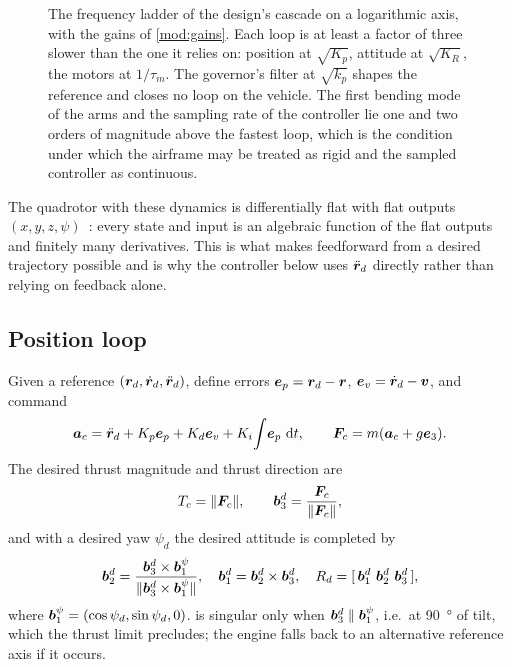 \begin{figure}[htbp]
\centering

\caption{The frequency ladder of the design's cascade on a logarithmic axis,
with the gains of \cref{mod:gains}. Each loop is at least a factor of three
slower than the one it relies on: position at $\sqrt{K_p}$, attitude at
$\sqrt{K_R}$, the motors at $1/\tau_m$. The governor's filter at $\sqrt{k_p}$
shapes the reference and closes no loop on the vehicle. The first bending mode
of the arms and the sampling rate of the controller lie one and two orders of
magnitude above the fastest loop, which is the condition under which the
airframe may be treated as rigid and the sampled controller as continuous.}
\label{fig:bandwidth}
\end{figure}

\begin{remark}[Flatness]
The quadrotor with these dynamics is differentially flat with flat outputs
$(x,y,z,\psi)$~\cite{mellinger2011}: every state and input is an algebraic
function of the flat outputs and finitely many derivatives. This is what makes
feedforward from a desired trajectory possible and is why the controller below
uses $\ddot{\bm{r}}_d$ directly rather than relying on feedback alone.
\end{remark}

\subsection{Position loop}

Given a reference $(\bm{r}_d,\dot{\bm{r}}_d,\ddot{\bm{r}}_d)$, define errors
$\bm{e}_p = \bm{r}_d - \bm{r}$, $\bm{e}_v = \dot{\bm{r}}_d - \bm{v}$, and
command
\begin{equation}
  \bm{a}_c = \ddot{\bm{r}}_d + K_p\bm{e}_p + K_d\bm{e}_v
              + K_i\!\int\!\bm{e}_p\,\,\mathrm{d} t ,
  \qquad
  \bm{F}_c = m(\bm{a}_c + g\bm{e}_3) .
  \label{eq:poscmd}
\end{equation}
The desired thrust magnitude and thrust direction are
\begin{equation}
  T_c = \|\bm{F}_c\|,
  \qquad
  \bm{b}_3^d = \frac{\bm{F}_c}{\|\bm{F}_c\|} ,
  \label{eq:thrustdir}
\end{equation}
and with a desired yaw $\psi_d$ the desired attitude is completed by
\begin{equation}
  \bm{b}_2^d = \frac{\bm{b}_3^d \times \bm{b}_1^{\psi}}
                     {\|\bm{b}_3^d \times \bm{b}_1^{\psi}\|},
  \quad
  \bm{b}_1^d = \bm{b}_2^d\times\bm{b}_3^d,
  \quad
  R_d = [\,\bm{b}_1^d\ \bm{b}_2^d\ \bm{b}_3^d\,],
  \label{eq:Rd}
\end{equation}
where $\bm{b}_1^{\psi}=(\cos\psi_d,\sin\psi_d,0)$.  is singular
only when $\bm{b}_3^d\parallel\bm{b}_1^{\psi}$, i.e.\ at \SI{90}{\degree} of
tilt, which the thrust limit precludes; the engine falls back to an alternative
reference axis if it occurs.

